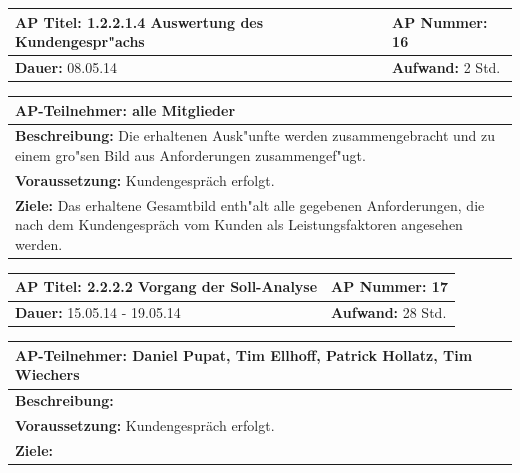 \documentclass[fontsize=12pt,paper=a4,twoside]{scrartcl}
\begin{document}
\begin{tabular}{|p{7.43cm}|p{7.43cm}|}
\hline
\textbf{AP Titel: }1.2.2.1.4 Auswertung des Kundengespr"achs & \textbf{AP Nummer: }16\\ 
\hline
\textbf{Dauer: }08.05.14& \textbf{Aufwand: } 2 Std.\\
\hline
\end{tabular}
\begin{tabular}{|p{15.3cm}|}
\hline
\textbf{AP-Teilnehmer: }alle Mitglieder\\
\hline
\textbf{Beschreibung: }Die erhaltenen Ausk"unfte werden zusammengebracht und zu einem gro"sen Bild aus Anforderungen zusammengef"ugt.\\
\hline
\textbf{Voraussetzung: }Kundengespräch erfolgt.\\
\hline 
\textbf{Ziele: }Das erhaltene Gesamtbild enth"alt alle gegebenen Anforderungen, die nach dem Kundengespräch vom Kunden als Leistungsfaktoren angesehen werden.\\
\hline 
\end{tabular}

\begin{tabular}{|p{7.43cm}|p{7.43cm}|}
\hline
\textbf{AP Titel: }2.2.2.2 Vorgang der Soll-Analyse & \textbf{AP Nummer: }17\\ 
\hline
\textbf{Dauer: }15.05.14 - 19.05.14 & \textbf{Aufwand: } 28 Std.\\
\hline
\end{tabular}
\begin{tabular}{|p{15.3cm}|}
\hline
\textbf{AP-Teilnehmer: }Daniel Pupat, Tim Ellhoff, Patrick Hollatz, Tim Wiechers\\
\hline
\textbf{Beschreibung: }\\
\hline
\textbf{Voraussetzung: }Kundengespräch erfolgt.\\
\hline 
\textbf{Ziele: }\\
\hline 
\end{tabular}
\end{document}
